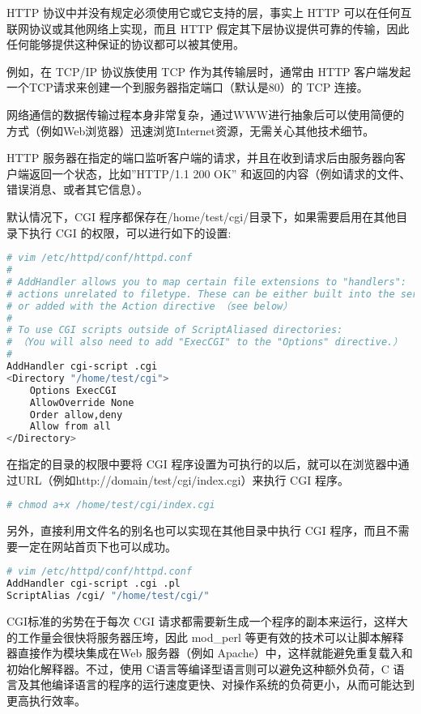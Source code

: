 HTTP 协议中并没有规定必须使用它或它支持的层，事实上 HTTP 可以在任何互联网协议或其他网络上实现，而且 HTTP 假定其下层协议提供可靠的传输，因此任何能够提供这种保证的协议都可以被其使用。

例如，在 TCP/IP 协议族使用 TCP 作为其传输层时，通常由 HTTP 客户端发起一个TCP请求来创建一个到服务器指定端口（默认是80）的 TCP 连接。

网络通信的数据传输过程本身非常复杂，通过WWW进行抽象后可以使用简便的方式（例如Web浏览器）迅速浏览Internet资源，无需关心其他技术细节。

HTTP 服务器在指定的端口监听客户端的请求，并且在收到请求后由服务器向客户端返回一个状态，比如”HTTP/1.1 200 OK” 和返回的内容（例如请求的文件、错误消息、或者其它信息）。


默认情况下，CGI 程序都保存在/home/test/cgi/目录下，如果需要启用在其他目录下执行 CGI 的权限，可以进行如下的设置:

\begin{lstlisting}[language=bash]
# vim /etc/httpd/conf/httpd.conf
#
# AddHandler allows you to map certain file extensions to "handlers":
# actions unrelated to filetype. These can be either built into the server
# or added with the Action directive （see below）
#
# To use CGI scripts outside of ScriptAliased directories:
# （You will also need to add "ExecCGI" to the "Options" directive.）
#
AddHandler cgi-script .cgi
<Directory "/home/test/cgi">
	Options ExecCGI
	AllowOverride None
	Order allow,deny
	Allow from all
</Directory>
\end{lstlisting}

在指定的目录的权限中要将 CGI 程序设置为可执行的以后，就可以在浏览器中通过URL（例如http://domain/test/cgi/index.cgi）来执行 CGI 程序。



\begin{lstlisting}[language=bash]
# chmod a+x /home/test/cgi/index.cgi
\end{lstlisting}

另外，直接利用文件名的别名也可以实现在其他目录中执行 CGI 程序，而且不需要一定在网站首页下也可以成功。


\begin{lstlisting}[language=bash]
# vim /etc/httpd/conf/httpd.conf
AddHandler cgi-script .cgi .pl
ScriptAlias /cgi/ "/home/test/cgi/"
\end{lstlisting}

CGI标准的劣势在于每次 CGI 请求都需要新生成一个程序的副本来运行，这样大的工作量会很快将服务器压垮，因此 mod\_perl 等更有效的技术可以让脚本解释器直接作为模块集成在Web 服务器（例如 Apache）中，这样就能避免重复载入和初始化解释器。不过，使用 C语言等编译型语言则可以避免这种额外负荷，C 语言及其他编译语言的程序的运行速度更快、对操作系统的负荷更小，从而可能达到更高执行效率。

